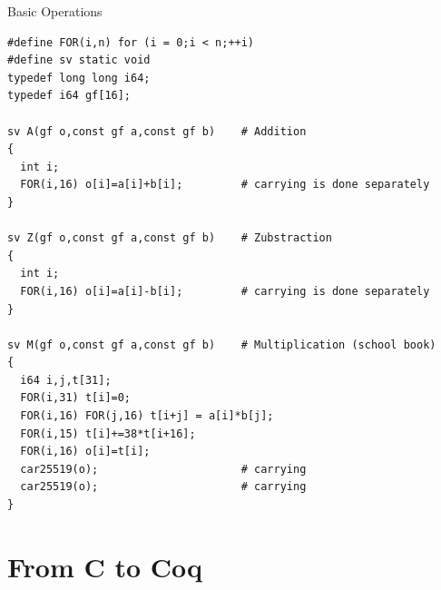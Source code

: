 \documentclass[8pt]{beamer}
\begin{document}
%
%
\begin{frame}[fragile]{Basic Operations}
  \begin{center}

\begin{lstlisting}[language=cnacl, caption=Basic Operations, label=cod:languageC31]
#define FOR(i,n) for (i = 0;i < n;++i)
#define sv static void
typedef long long i64;
typedef i64 gf[16];

sv A(gf o,const gf a,const gf b)    # Addition
{
  int i;
  FOR(i,16) o[i]=a[i]+b[i];         # carrying is done separately
}

sv Z(gf o,const gf a,const gf b)    # Zubstraction
{
  int i;
  FOR(i,16) o[i]=a[i]-b[i];         # carrying is done separately
}

sv M(gf o,const gf a,const gf b)    # Multiplication (school book)
{
  i64 i,j,t[31];
  FOR(i,31) t[i]=0;
  FOR(i,16) FOR(j,16) t[i+j] = a[i]*b[j];
  FOR(i,15) t[i]+=38*t[i+16];
  FOR(i,16) o[i]=t[i];
  car25519(o);                      # carrying
  car25519(o);                      # carrying
}
\end{lstlisting}

  \end{center}
\end{frame}

\section{From C to Coq}

%
%
\end{document}
